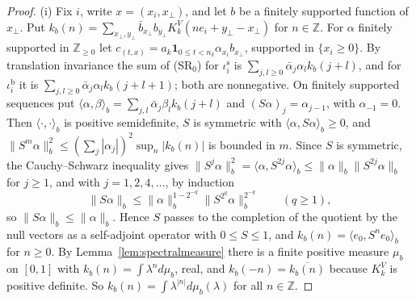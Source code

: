 \documentclass[aps,prd,twocolumn,superscriptaddress,nofootinbib,longbibliography,floatfix,amsmath,amssymb,10pt]{revtex4-2}
\theoremstyle{definition}
\theoremstyle{remark}
\newcommand{\Z}{\mathbb{Z}}
\newcommand{\ip}[2]{\langle #1,#2\rangle}
\begin{document}
\begin{proof}
(i) Fix $i$, write $x=(x_i,x_\perp)$, and let $b$ be a finitely supported
function of $x_\perp$. Put $k_b(n)=\sum_{x_\perp,y_\perp}\bar b_{x_\perp}
b_{y_\perp}K^V_k(ne_i+y_\perp-x_\perp)$ for $n\in\Z$. For $\alpha$ finitely
supported in $\Z_{\ge0}$ let $c_{(t,x)}=a_k\mathbf 1_{0\le t<n_\delta}
\alpha_{x_i}b_{x_\perp}$, supported in $\{x_i\ge0\}$. By translation
invariance the sum of (SR$_0$) for $\iota^{\mathrm s}_i$ is
$\sum_{j,l\ge0}\bar\alpha_j\alpha_lk_b(j+l)$, and for $\iota^{\mathrm b}_i$
it is $\sum_{j,l\ge0}\bar\alpha_j\alpha_lk_b(j+l+1)$; both are
nonnegative. On finitely supported sequences put $\ip\alpha\beta_b=\sum_{j,l}
\bar\alpha_j\beta_lk_b(j+l)$ and $(S\alpha)_j=\alpha_{j-1}$, with
$\alpha_{-1}=0$. Then $\ip\cdot\cdot_b$ is positive semidefinite, $S$ is
symmetric with $\ip\alpha{S\alpha}_b\ge0$, and $\|S^m\alpha\|_b^2\le
(\sum_j|\alpha_j|)^2\sup_n|k_b(n)|$ is bounded in $m$. Since $S$ is symmetric, the Cauchy--Schwarz
inequality gives $\|S^j\alpha\|_b^2=\ip\alpha{S^{2j}\alpha}_b\le\|\alpha\|_b
\|S^{2j}\alpha\|_b$ for $j\ge1$, and with $j=1,2,4,\dots$, by induction
\[
\|S\alpha\|_b\le\|\alpha\|_b^{1-2^{-q}}\|S^{2^q}\alpha\|_b^{2^{-q}}
\qquad(q\ge1),
\]
so $\|S\alpha\|_b\le\|\alpha\|_b$. Hence $S$ passes to the completion of
the quotient by the null vectors as a self-adjoint operator with $0\le S\le1$,
and $k_b(n)=\ip{e_0}{S^ne_0}_b$ for $n\ge0$. By
Lemma~\ref{lem:spectralmeasure} there is a finite positive measure $\mu_b$
on $[0,1]$ with $k_b(n)=\int\lambda^nd\mu_b$, real, and $k_b(-n)=
\overline{k_b(n)}$ because $K^V_k$ is positive definite. So $k_b(n)=\int
\lambda^{|n|}d\mu_b(\lambda)$ for all $n\in\Z$.


\end{proof}
\end{document}
